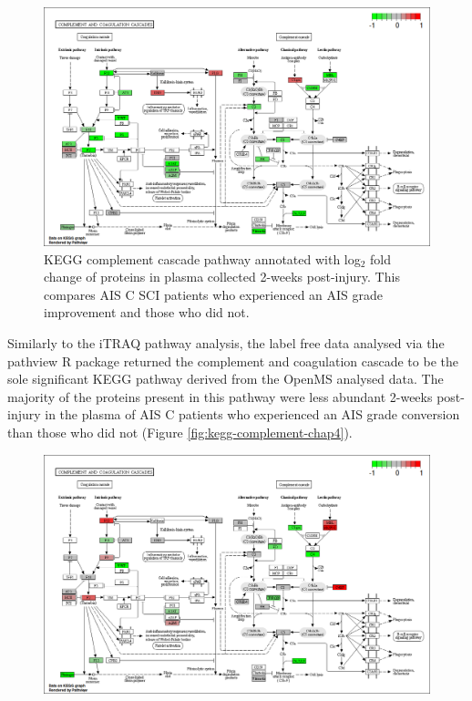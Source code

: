 \documentclass[9pt,lineno]{elife}
\begin{document}
\begin{landscape}
\begin{landscape}
\begin{figure}
{\centering \includegraphics[width=18.31in]{figures/kegg_pathways/hsa04610_pathview} 

}

\caption{KEGG complement cascade pathway annotated with log\(_2\) fold change of proteins in plasma collected 2-weeks post-injury. This compares AIS C SCI patients who experienced an AIS grade improvement and those who did not.}\label{fig:kegg-complement}
\end{figure}

Similarly to the iTRAQ pathway analysis, the label free data analysed via the pathview R package returned the complement and coagulation cascade to be the sole significant KEGG pathway derived from the OpenMS analysed data.
The majority of the proteins present in this pathway were less abundant 2-weeks post-injury in the plasma of AIS C patients who experienced an AIS grade conversion than those who did not (Figure \ref{fig:kegg-complement-chap4}).



\begin{figure}

{\centering \includegraphics[width=18.31in]{figures/kegg_pathways/hsa04610.pathview_label-free} 

}
\end{figure}
\end{landscape}
\end{landscape}
\end{document}
